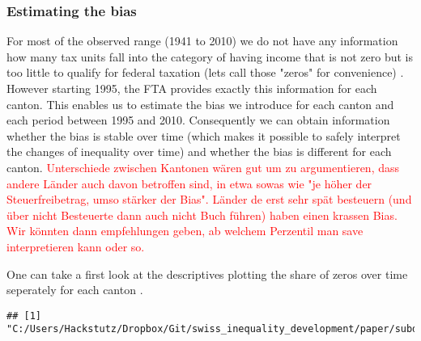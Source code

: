 \subsubsection{Estimating the bias}
For most of the observed range (1941 to 2010) we do not have any information how many tax units fall into the category of having income that is not zero but is too little to qualify for federal taxation (lets call those "zeros" for convenience) . However starting 1995, the FTA provides exactly this information for each canton. This enables us to estimate the bias we introduce for each canton and each period between 1995 and 2010. Consequently we can obtain information whether the bias is stable over time (which makes it possible to safely interpret the changes of inequality over time) and whether the bias is different for each canton. \textcolor{red}{Unterschiede zwischen Kantonen wären gut um zu argumentieren, dass andere Länder auch davon betroffen sind, in etwa sowas wie "je höher der Steuerfreibetrag, umso stärker der Bias". Länder de erst sehr spät besteuern (und über nicht Besteuerte dann auch nicht Buch führen) haben einen krassen Bias. Wir könnten dann empfehlungen geben, ab welchem Perzentil man save interpretieren kann oder so.}

One can take a first look at the descriptives plotting the share of zeros over time seperately for each canton .

\begin{knitrout}
\color{fgcolor}\begin{kframe}
\begin{alltt}
\hlstd{()}
\end{alltt}
\begin{verbatim}
## [1] "C:/Users/Hackstutz/Dropbox/Git/swiss_inequality_development/paper/subdocuments"
\end{verbatim}
\begin{alltt}
 \hlkwb{<-} \hlstd{(}\hlstd{)}
\end{alltt}


{\ttfamily\noindent\bfseries\color{errorcolor}{\#\# Error: unable to open file: 'No such file or directory'}}\end{kframe}
\end{knitrout}


